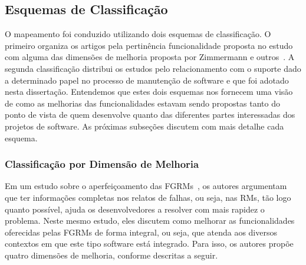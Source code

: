 \subsection{Esquemas de Classificação}\label{subsec:map-esquemas-classificacao}

O mapeamento foi conduzido utilizando dois esquemas de classificação. O
primeiro organiza os artigos pela pertinência funcionalidade proposta no estudo
com alguma das dimensões de melhoria proposta por Zimmermann e
outros~\cite{zimmermann2009improving}. A segunda classificação distribui os
estudos pelo relacionamento com o suporte dado a determinado papel no processo
de manutenção de software e que foi adotado nesta dissertação. Entendemos que
estes dois esquemas nos fornecem uma visão de como as melhorias das
funcionalidades estavam sendo propostas tanto do ponto de vista de quem
desenvolve quanto das diferentes partes interessadas dos projetos de software.
As pró\-xi\-mas subseções discutem com mais detalhe cada esquema.

\subsubsection{Classificação por Dimensão de Melhoria}\label{subsubsec:map-esquema-suporte-problema}

Em um estudo sobre o aperfeiçoamento das FGRMs~\cite{zimmermann2009improving},
os autores argumentam que ter informações completas nos relatos de falhas, ou
seja, nas RMs, tão logo quanto possível, ajuda os desenvolvedores a resolver
com mais rapidez o problema. Neste mesmo estudo, eles discutem como melhorar as
funcionalidades oferecidas pelas FGRMs de forma integral, ou seja, que atenda
aos diversos contextos em que este tipo software está integrado. Para isso, os
autores propõe quatro dimensões de melhoria, conforme descritas a seguir.

